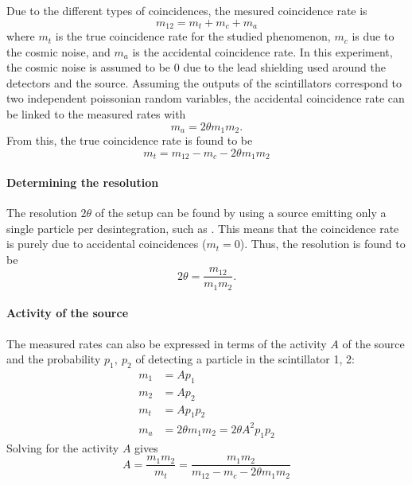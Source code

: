 Due to the different types of coincidences, the mesured coincidence rate is
\begin{equation}
    m_{12} = m_t + m_c + m_a
\end{equation}
where \(m_t\) is the true coincidence rate for the studied phenomenon, \(m_c\) is due to the cosmic noise, and \(m_a\) is the accidental coincidence rate. In this experiment, the cosmic noise is assumed to be \(0\) due to the lead shielding used around the detectors and the source. Assuming the outputs of the scintillators correspond to two independent poissonian random variables, the accidental coincidence rate can be linked to the measured rates with
\begin{equation}
    m_a = 2\theta m_1 m_2.
\end{equation}
From this, the true coincidence rate is found to be
\begin{equation}
    m_t = m_{12} - m_c - 2\theta m_1 m_2
\end{equation}

\paragraph{Determining the resolution}
The resolution \(2 \theta\) of the setup can be found by using a source emitting only a single particle per desintegration, such as \cesium. This means that the coincidence rate is purely due to accidental coincidences (\(m_t = 0\)). Thus, the resolution is found to be
\begin{equation}
    2\theta = \frac{m_{12}}{m_1 m_2}.
\end{equation}

\paragraph{Activity of the source}
The measured rates can also be expressed in terms of the activity \(A\) of the source and the probability \(p_1,\ p_2\) of detecting a particle in the scintillator 1, 2:
\begin{equation}
    \begin{aligned}
        m_1 &= A p_1 \\
        m_2 &= A p_2 \\
        m_t &= A p_1 p_2 \\
        m_a &= 2\theta m_1 m_2 = 2\theta A^2 p_1 p_2
    \end{aligned}
\end{equation}
Solving for the activity \(A\) gives
\begin{equation}
    A = \frac{m_1 m_2}{m_t} = \frac{m_1 m_2}{m_{12} - m_c - 2\theta m_1 m_2}
\end{equation}
